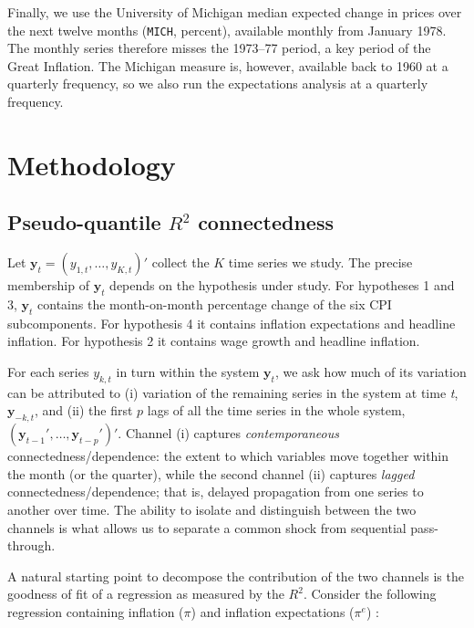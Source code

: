 \documentclass{article}
\begin{document}
Finally, we use the University of Michigan median expected change in prices over the next twelve
months (\texttt{MICH}, percent), available monthly from January 1978. The monthly series therefore
misses the 1973--77 period, a key period of the Great Inflation. The Michigan measure is, however, available
back to 1960 at a quarterly frequency, so we also run the expectations analysis at a quarterly frequency.
   
    


\section{Methodology}\label{sec:method}

\subsection{Pseudo-quantile $R^2$ connectedness}


Let $\bm{y}_t=(y_{1,t},\dots,y_{K,t})'$ collect the $K$ time series we study. The precise membership of $\bm{y}_t$ depends on the hypothesis under study. For hypotheses 1 and 3, $\bm{y}_t$ contains the month-on-month percentage change of the six CPI subcomponents. For hypothesis 4 it contains inflation expectations and headline inflation. For hypothesis 2 it contains wage growth  and headline inflation.

For each series $y_{k,t}$ in turn within the system $\bm{y}_t$, we ask how much of its variation can be attributed
to (i) variation of the remaining series in the system at time \textit{t}, $\bm{y}_{-k,t}$, and (ii)
the first $p$ lags of all the time series in the whole system, $(\bm{y}_{t-1}',\dots,\bm{y}_{t-p}')'$.
Channel (i) captures \emph{contemporaneous} connectedness/dependence: the extent to which variables
move together within the month (or the quarter), while the second channel (ii) captures \emph{lagged}
connectedness/dependence; that is, delayed propagation from one series to another over time. The ability to isolate and distinguish between the two channels is what allows us to separate a common shock from
sequential pass-through.

A natural starting point to decompose the contribution of the two channels is the goodness of fit of a regression as measured by the $R^2$. Consider the following regression containing inflation ($\pi$) and inflation expectations ($\pi^e$)
:
\end{document}
